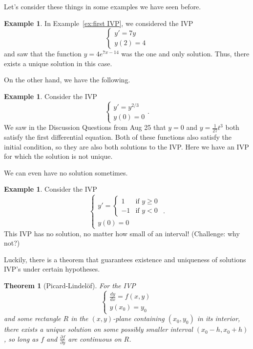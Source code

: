 \documentclass[12pt]{amsart}
\numberwithin{equation}{section}
\theoremstyle{plain} %
\newtheorem{thm}[equation]{Theorem}
\theoremstyle{definition}
\newtheorem{ex}[equation]{Example}
\theoremstyle{remark}
\begin{document}
Let's consider these things in some examples we have seen before.

\begin{ex} In Example~\ref{ex:first IVP}, we considered the IVP
\[\begin{cases} y' = 7y \\ 
y(2)=4 \end{cases}\]
and saw that the function $y= 4 e^{7x-14}$ was the one and only solution. Thus, there exists a unique solution in this case.
\end{ex}


On the other hand, we have the following.

\begin{ex} Consider the IVP
\[\begin{cases} y' = y^{2/3} \\ 
y(0)=0 \end{cases}.\]
We saw in the Discussion Questions from Aug 25 that $y=0$ and $y=\frac{1}{27} t^3$ both satisfy the first differential equation. Both of these functions also satisfy the initial condition, so they are also both solutions to the IVP. Here we have an IVP for which the solution is not unique.
\end{ex}

We can even have no solution sometimes.

\begin{ex} Consider the IVP
\[\begin{cases} y' = \begin{cases} 1 & \text{if } y\geq 0 \\ -1 & \text{if } y  <0\end{cases}\\ y(0) = 0\end{cases}.\]
This IVP has no solution, no matter how small of an interval! (Challenge: why not?)
\end{ex}

Luckily, there is a theorem that guarantees existence and uniqueness of solutions IVP's under certain hypotheses.

\begin{thm}[Picard-Lindel\"of] For the IVP
\[\begin{cases} \frac{dy}{dx} = f(x,y) \\ 
y(x_0) = y_0 \end{cases}\]
and some rectangle $R$ in the $(x,y)$-plane containing $(x_0,y_0)$ in its interior,
there exists a unique solution on some possibly smaller interval $(x_0 - h, x_0+h)$, so long as $f$ and $\frac{\partial f}{\partial y}$ are continuous on $R$.
\end{thm}
\end{document}

